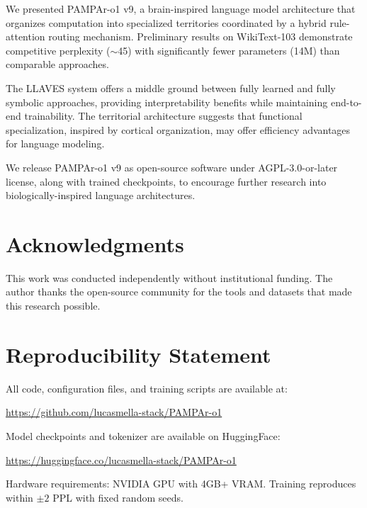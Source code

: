 \documentclass[11pt,a4paper]{article}
\begin{document}
We presented PAMPAr-o1 v9, a brain-inspired language model architecture that organizes computation into specialized territories coordinated by a hybrid rule-attention routing mechanism. Preliminary results on WikiText-103 demonstrate competitive perplexity ($\sim$45) with significantly fewer parameters (14M) than comparable approaches.

The LLAVES system offers a middle ground between fully learned and fully symbolic approaches, providing interpretability benefits while maintaining end-to-end trainability. The territorial architecture suggests that functional specialization, inspired by cortical organization, may offer efficiency advantages for language modeling.

We release PAMPAr-o1 v9 as open-source software under AGPL-3.0-or-later license, along with trained checkpoints, to encourage further research into biologically-inspired language architectures.

\section*{Acknowledgments}

This work was conducted independently without institutional funding. The author thanks the open-source community for the tools and datasets that made this research possible.

\section*{Reproducibility Statement}

All code, configuration files, and training scripts are available at:
\begin{center}
\url{https://github.com/lucasmella-stack/PAMPAr-o1}
\end{center}

Model checkpoints and tokenizer are available on HuggingFace:
\begin{center}
\url{https://huggingface.co/lucasmella-stack/PAMPAr-o1}
\end{center}

Hardware requirements: NVIDIA GPU with 4GB+ VRAM. Training reproduces within $\pm 2$ PPL with fixed random seeds.
\end{document}
